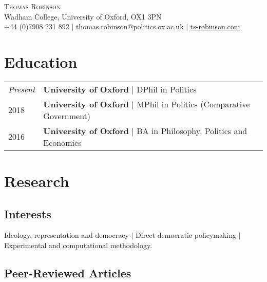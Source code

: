 \documentclass[11pt, a4paper]{article}
\begin{document}
 \begin{center}
    \textsc{\huge Thomas Robinson} \\
    Wadham College, University of Oxford, OX1 3PN \\
    +44 (0)7908 231 892 $|$ thomas.robinson@politics.ox.ac.uk $|$ \href{https://ts-robinson.com}{ts-robinson.com}
 \end{center}



 \section*{Education}
 \begin{tabular}{ll}
    \textit{Present} & \textbf{University of Oxford} $|$ DPhil in Politics \\
    2018  & \textbf{University of Oxford} $|$ MPhil in Politics (Comparative Government) \\
    2016 & \textbf{University of Oxford} $|$ BA in Philosophy, Politics and Economics
 \end{tabular}

 \section*{Research}

 \subsection*{Interests}
 Ideology, representation and democracy $|$ Direct democratic policymaking $|$ Experimental and computational methodology.

 \subsection*{Peer-Reviewed Articles}
\end{document}
